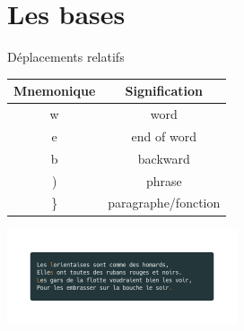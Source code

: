 \documentclass[10pt]{beamer}
\begin{document}
		\section{Les bases}
			\begin{frame}{Déplacements relatifs}
				\center
				\begin{tabular}{|c|c|}
					\hline
					\textbf{Mnemonique} & \textbf{Signification} \\ 
					\hline
					\hline
					w & word \\ 
					\hline
					e & end of word \\ 
					\hline
					b & backward \\ 
					\hline
					) & phrase \\ 
					\hline
					\} & paragraphe/fonction \\ 
					\hline
				\end{tabular}
				\includegraphics[width=256]{img/moves.png}
			\end{frame}
\end{document}
